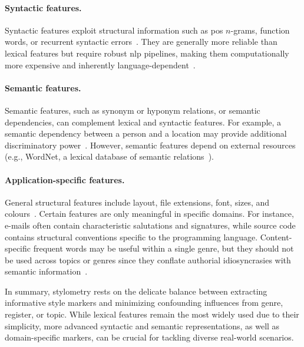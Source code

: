 \paragraph{Syntactic features.}
Syntactic features exploit structural information such as \ac{pos} $n$-grams, function words, or recurrent syntactic errors~\citep{stamatatos_survey_2009,abbasi_writeprints_2008}.
They are generally more reliable than lexical features but require robust \ac{nlp} pipelines, making them computationally more expensive and inherently language-dependent~\citep{neal_surveying_2018,stamatatos_survey_2009}.

\paragraph{Semantic features.}
Semantic features, such as synonym or hyponym relations, or semantic dependencies, can complement lexical and syntactic features. 
For example, a semantic dependency between a person and a location may provide additional discriminatory power~\citep{stamatatos_survey_2009,neal_surveying_2018}. 
However, semantic features depend on external resources (e.g., WordNet, a lexical database of semantic relations~\citep{zhou_paraphrase_2025}).


\paragraph{Application-specific features.} %
General structural features include layout, file extensions, font, sizes, and colours~\citep{abbasi_writeprints_2008,neal_surveying_2018}.
Certain features are only meaningful in specific domains. 
For instance, e-mails often contain characteristic salutations and signatures, while source code contains structural conventions specific to the programming language. 
Content-specific frequent words may be useful within a single genre, but they should not be used across topics or genres since they conflate authorial idiosyncrasies with semantic information~\citep{abbasi_writeprints_2008}.


In summary, stylometry rests on the delicate balance between extracting informative style markers and minimizing confounding influences from genre, register, or topic. 
While lexical features remain the most widely used due to their simplicity, more advanced syntactic and semantic representations, as well as domain-specific markers, can be crucial for tackling diverse real-world scenarios.
